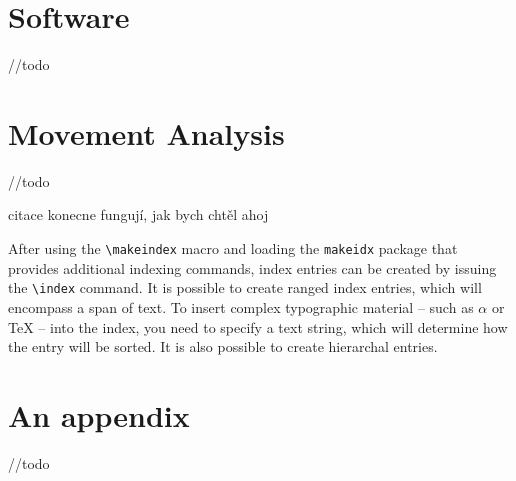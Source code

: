 \documentclass[
  digital, %
  table,   %
  lof,     %
  lot,     %
]{fithesis3}
\begin{document}





\chapter{Software}
//todo

\chapter{Movement Analysis}
//todo

citace konecne fungují, jak bych chtěl \cite{einstein} ahoj

After using the \verb"\makeindex" macro and loading the
\texttt{makeidx} package that provides additional indexing
commands, index entries can be created by issuing the \verb"\index"
command. It is possible to create ranged index
entries, which will encompass a span of text.
To insert complex typographic material -- such as $\alpha$
 or \TeX{}  --
into the index, you need to specify a text string, which will
determine how the entry will be sorted. It is also possible to
create hierarchal entries. 



\printbibliography[heading=bibintoc] %

\makeatletter\thesis@blocks@clear\makeatother
{} %
\printindex

\appendix
\chapter{An appendix}
//todo
\end{document}

